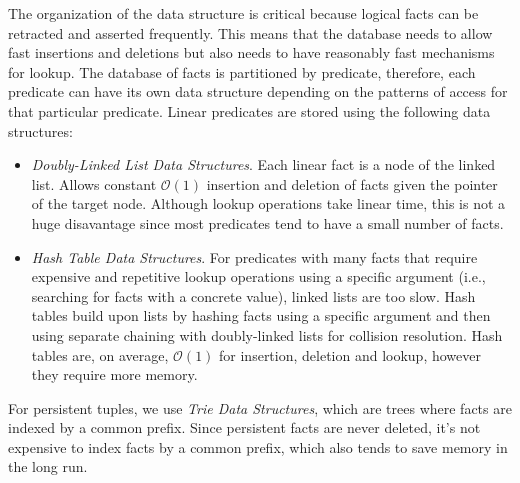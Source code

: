 The organization of the data structure is critical because logical facts can be
retracted and asserted frequently. This means that the database needs to allow
fast insertions and deletions but also needs to have reasonably fast mechanisms
for lookup. The database of facts is partitioned by predicate, therefore, each
predicate can have its own data structure depending on the patterns of access
for that particular predicate. Linear predicates are stored using the
following data structures:

\begin{itemize}
   \item \emph{Doubly-Linked List Data Structures}. Each linear fact is a node
   of the linked list. Allows constant
   $\mathcal{O}(1)$ insertion and deletion of facts given the pointer of the
   target node. Although lookup operations take linear time, this is not a huge
   disavantage since most predicates tend to have a small number of facts.
   \item \emph{Hash Table Data Structures}. For predicates with many facts that
   require expensive and repetitive lookup operations using a specific argument
   (i.e., searching for facts with a concrete value), linked lists are too slow.
   Hash tables build upon lists by hashing facts using a specific argument and
   then using separate chaining with doubly-linked lists for collision
   resolution. Hash tables are, on average, $\mathcal{O}(1)$ for insertion,
   deletion and lookup, however they require more memory.
\end{itemize}

For persistent tuples, we use \emph{Trie Data Structures}, which are trees where
facts are indexed by a common prefix. Since persistent facts are never deleted,
it's not expensive to index facts by a common prefix, which also tends to save
memory in the long run.
